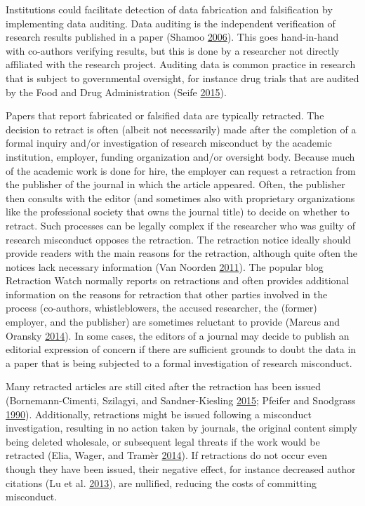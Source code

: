 \documentclass[a5paper]{book}
\begin{document}
Institutions could facilitate detection of data fabrication and
falsification by implementing data auditing. Data auditing is the
independent verification of research results published in a paper
(Shamoo \protect\hyperlink{ref-doi:10.1038ux2f439784c}{2006}). This goes
hand-in-hand with co-authors verifying results, but this is done by a
researcher not directly affiliated with the research project. Auditing
data is common practice in research that is subject to governmental
oversight, for instance drug trials that are audited by the Food and
Drug Administration (Seife
\protect\hyperlink{ref-doi:10.1001ux2fjamainternmed.2014.7774}{2015}).

Papers that report fabricated or falsified data are typically retracted.
The decision to retract is often (albeit not necessarily) made after the
completion of a formal inquiry and/or investigation of research
misconduct by the academic institution, employer, funding organization
and/or oversight body. Because much of the academic work is done for
hire, the employer can request a retraction from the publisher of the
journal in which the article appeared. Often, the publisher then
consults with the editor (and sometimes also with proprietary
organizations like the professional society that owns the journal title)
to decide on whether to retract. Such processes can be legally complex
if the researcher who was guilty of research misconduct opposes the
retraction. The retraction notice ideally should provide readers with
the main reasons for the retraction, although quite often the notices
lack necessary information (Van Noorden
\protect\hyperlink{ref-doi:10.1038ux2f478026a}{2011}). The popular blog
Retraction Watch normally reports on retractions and often provides
additional information on the reasons for retraction that other parties
involved in the process (co-authors, whistleblowers, the accused
researcher, the (former) employer, and the publisher) are sometimes
reluctant to provide (Marcus and Oransky
\protect\hyperlink{ref-doi:10.1128ux2fjmbe.v15i2.855}{2014}). In some
cases, the editors of a journal may decide to publish an editorial
expression of concern if there are sufficient grounds to doubt the data
in a paper that is being subjected to a formal investigation of research
misconduct.

Many retracted articles are still cited after the retraction has been
issued (Bornemann-Cimenti, Szilagyi, and Sandner-Kiesling
\protect\hyperlink{ref-doi:10.1007ux2fs11948-015-9680-y}{2015}; Pfeifer
and Snodgrass
\protect\hyperlink{ref-doi:10.1001ux2fjama.1990.03440100140020}{1990}).
Additionally, retractions might be issued following a misconduct
investigation, resulting in no action taken by journals, the original
content simply being deleted wholesale, or subsequent legal threats if
the work would be retracted (Elia, Wager, and Tramèr
\protect\hyperlink{ref-doi:10.1371ux2fjournal.pone.0085846}{2014}). If
retractions do not occur even though they have been issued, their
negative effect, for instance decreased author citations (Lu et al.
\protect\hyperlink{ref-doi:10.1038ux2fsrep03146}{2013}), are nullified,
reducing the costs of committing misconduct.
\end{document}

